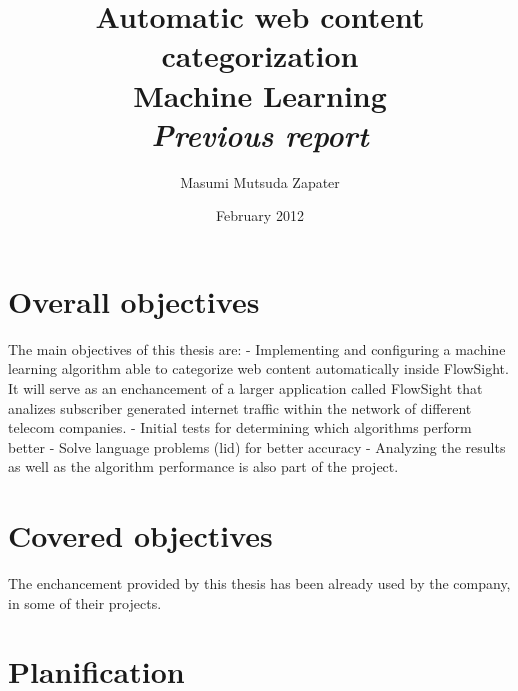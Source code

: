 \documentclass[12pt, a4paper , titlepage]{report}
\author{Masumi Mutsuda Zapater}
\title{Automatic web content categorization \\ Machine Learning \\ \large{\textit{Previous report}}}
\date{February 2012}
\begin{document}
\maketitle

\tableofcontents


\chapter{Overall objectives}
The main objectives of this thesis are:
- Implementing and configuring a machine learning algorithm able to categorize web content automatically inside FlowSight. 
It will serve as an enchancement of a larger application called FlowSight that analizes subscriber generated internet traffic within the network of different telecom companies.
- Initial tests for determining which algorithms perform better
- Solve language problems (lid) for better accuracy
- Analyzing the results as well as the algorithm performance is also part of the project.


\chapter{Covered objectives}
The enchancement provided by this thesis has been already used by the company, in some of their projects. 


\chapter{Planification}
\end{document}
